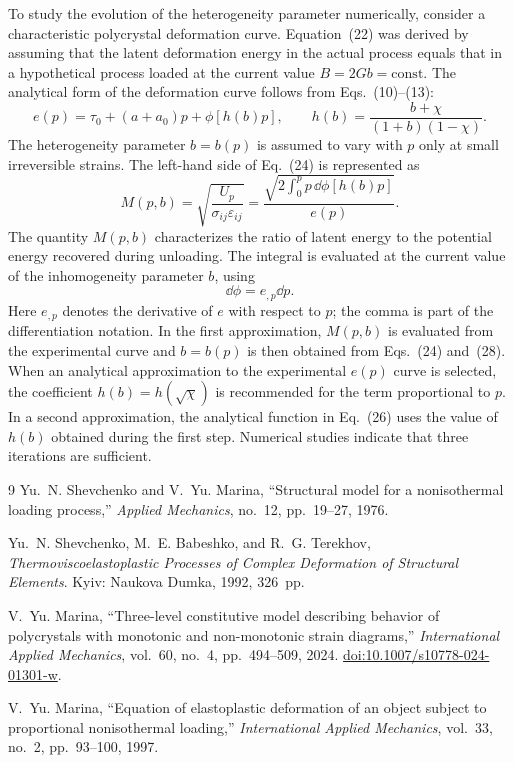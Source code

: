 To study the evolution of the heterogeneity parameter numerically, consider a characteristic polycrystal deformation curve. Equation~(22) was derived by assuming that the latent deformation energy in the actual process equals that in a hypothetical process loaded at the current value $B=2Gb=\text{const}$. The analytical form of the deformation curve follows from Eqs.~(10)--(13):
\begin{equation}
 e(p)=\tau_0+(a+a_0)p+\phi[h(b)p],
 \qquad
 h(b)=\frac{b+\chi}{(1+b)(1-\chi)}.
\end{equation}
The heterogeneity parameter $b=b(p)$ is assumed to vary with $p$ only at small irreversible strains. The left-hand side of Eq.~(24) is represented as
\begin{equation}
 M(p,b)
 =\sqrt{\frac{U_p}{\sigma_{ij}\varepsilon_{ij}}}
 =\frac{\sqrt{2\int_0^p p\,\dd\phi[h(b)p]}}{e(p)}.
\end{equation}
The quantity $M(p,b)$ characterizes the ratio of latent energy to the potential energy recovered during unloading. The integral is evaluated at the current value of the inhomogeneity parameter $b$, using
\begin{equation}
 \dd\phi=e_{,p}\dd p.
\end{equation}
Here $e_{,p}$ denotes the derivative of $e$ with respect to $p$; the comma is part of the differentiation notation. In the first approximation, $M(p,b)$ is evaluated from the experimental curve and $b=b(p)$ is then obtained from Eqs.~(24) and~(28). When an analytical approximation to the experimental $e(p)$ curve is selected, the coefficient $h(b)=h(\sqrt\chi)$ is recommended for the term proportional to $p$. In a second approximation, the analytical function in Eq.~(26) uses the value of $h(b)$ obtained during the first step. Numerical studies indicate that three iterations are sufficient.

\begin{thebibliography}{9}
Yu.~N. Shevchenko and V.~Yu. Marina,
``Structural model for a nonisothermal loading process,''
\emph{Applied Mechanics}, no.~12, pp.~19--27, 1976.

Yu.~N. Shevchenko, M.~E. Babeshko, and R.~G. Terekhov,
\emph{Thermoviscoelastoplastic Processes of Complex Deformation of Structural Elements}.
Kyiv: Naukova Dumka, 1992, 326~pp.

V.~Yu. Marina,
``Three-level constitutive model describing behavior of polycrystals with monotonic and non-monotonic strain diagrams,''
\emph{International Applied Mechanics}, vol.~60, no.~4, pp.~494--509, 2024.
\href{https://doi.org/10.1007/s10778-024-01301-w}{doi:10.1007/s10778-024-01301-w}.

V.~Yu. Marina,
``Equation of elastoplastic deformation of an object subject to proportional nonisothermal loading,''
\emph{International Applied Mechanics}, vol.~33, no.~2, pp.~93--100, 1997.
\end{thebibliography}
